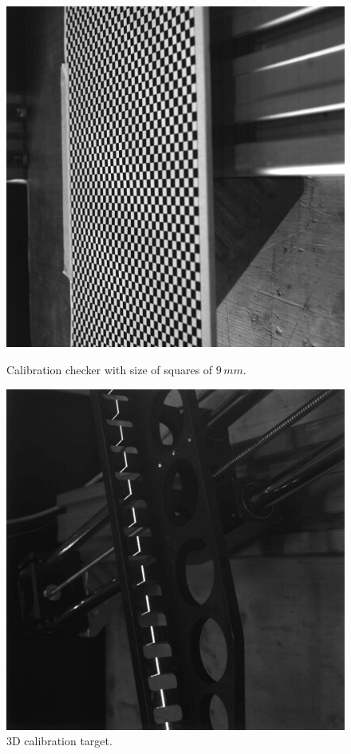   \begin{figure}[t!]
    \centering
    \begin{minipage}[c]{.48\textwidth}
      \centering
      \includegraphics[angle=270, origin=c, width=\textwidth]{./images/analysis/checker09.jpg}
      \caption{Calibration checker with size of squares of $9 \, mm$.}
      \label{fig:calib1}
    \end{minipage}
    \hfill
    \begin{minipage}[c]{.48\textwidth}
      \centering
      \includegraphics[angle=270, origin=c, width=\textwidth]{./images/analysis/gage.jpg}
      \caption{3D calibration target. \\ ~}
      \label{fig:calib2}
    \end{minipage}
  \end{figure}

